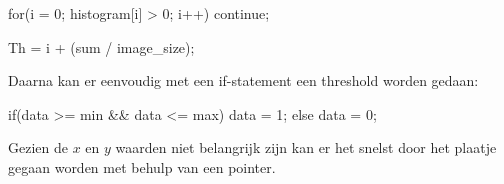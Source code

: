 \begin{cppcode}
    for(i = 0; histogram[i] > 0; i++){
        continue;
    }

    Th = i + (sum / image_size);
\end{cppcode}

Daarna  kan er eenvoudig met een if-statement een threshold worden gedaan:

\begin{cppcode}
    if(data >= min && data <= max){
        data = 1;
    } else {
        data = 0;
    }
\end{cppcode}

Gezien de $x$ en $y$ waarden niet belangrijk zijn kan er het snelst door het
plaatje gegaan worden met behulp van een pointer.

